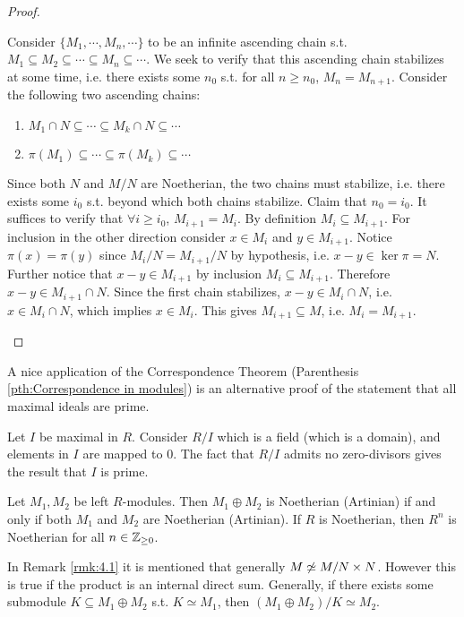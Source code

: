 \begin{proof}
\begin{itemize}
        Consider $\{M_1, \cdots, M_n, \cdots\}$ to be an infinite ascending chain s.t. $M_1\subseteq M_2\subseteq \cdots \subseteq M_n \subseteq \cdots$. We seek to verify that this ascending chain stabilizes at some time, i.e. there exists some $n_0$ s.t. for all $n \geq n_0$, $M_n = M_{n+1}$. Consider the following two ascending chains:
        \begin{enumerate}[label=(\arabic*)]
            \item $M_1\cap N \subseteq \cdots \subseteq M_k\cap N \subseteq \cdots $
            \item $\pi(M_1)\subseteq \cdots \subseteq \pi(M_k) \subseteq \cdots$
        \end{enumerate}
        Since both $N$ and $M/N$ are Noetherian, the two chains must stabilize, i.e. there exists some $i_0$ s.t. beyond which both chains stabilize. Claim that $n_0 = i_0$. It suffices to verify that $\forall i \geq i_0$, $M_{i+1} = M_i$. By definition $M_i\subseteq M_{i+1}$. For inclusion in the other direction consider $x\in M_i$ and $y\in M_{i+1}$. Notice $\pi(x) = \pi(y)$ since $M_i/N = M_{i+1}/N$ by hypothesis, i.e. $x - y \in \ker\pi = N$. Further notice that $x - y \in M_{i+1}$ by inclusion $M_i \subseteq M_{i+1}$. Therefore $x - y \in M_{i+1} \cap N$. Since the first chain stabilizes, $x - y \in M_i \cap N$, i.e. $x \in M_i\cap N$, which implies $x\in M_i$. This gives $M_{i+1} \subseteq M$, i.e. $M_i = M_{i+1}$.
    \end{itemize}
\end{proof}

\begin{remark}
    A nice application of the Correspondence Theorem (Parenthesis \ref{pth:Correspondence in modules}) is an alternative proof of the statement that all maximal ideals are prime. 

    Let $I$ be maximal in $R$. Consider $R/I$ which is a field (which is a domain), and elements in $I$ are mapped to 0. The fact that $R/I$ admits no zero-divisors gives the result that $I$ is prime. 
\end{remark}

\begin{corollary}
    Let $M_1, M_2$ be left $R$-modules. Then $M_1\oplus M_2$ is Noetherian (Artinian) if and only if both $M_1$ and $M_2$ are Noetherian (Artinian). If $R$ is Noetherian, then $R^n$ is Noetherian for all $n\in\mathbb{Z}_{\geq 0}$.
\end{corollary}

\begin{remark}
    In Remark \ref{rmk:4.1} it is mentioned that generally $M \centernot\simeq M/N \times N$. However this is true if the product is an internal direct sum. Generally, if there exists some submodule $K \subseteq M_1 \oplus M_2$ s.t. $K \simeq M_1$, then $(M_1 \oplus M_2)/K \simeq M_2$. 
\end{remark}

